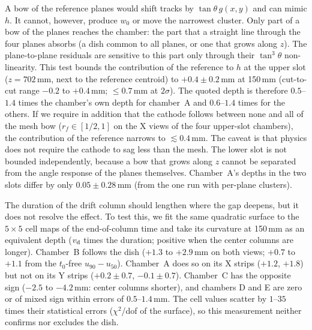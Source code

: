 A bow of the reference planes would shift tracks by $\tan\theta\, g(x,y)$ and can mimic $h$. It cannot, however,
produce $w_0$ or move the narrowest cluster. Only part of a bow of the planes reaches the chamber: the part that a
straight line through the four planes absorbs (a dish common to all planes, or one that grows along $z$). The
plane-to-plane residuals are sensitive to this part only through their $\tan^3\theta$ non-linearity. This test bounds
the contribution of the reference to $h$ at the upper slot ($z=702$\,mm, next to the reference centroid) to
$+0.4\pm0.2$\,mm at 150\,mm (cut-to-cut range $-0.2$ to $+0.4$\,mm; $\le0.7$\,mm at $2\sigma$). The quoted depth is
therefore $0.5$--$1.4$ times the chamber's own depth for chamber~A and $0.6$--$1.4$ times for the others. If we
require in addition that the cathode follows between none and all of the mesh bow ($r_f\in[1/2,1]$ on the X views of
the four upper-slot chambers), the contribution of the reference narrows to $\lesssim0.4$\,mm. The caveat is that
physics does not require the cathode to sag less than the mesh. The lower slot is not bounded independently, because
a bow that grows along $z$ cannot be separated from the angle response of the planes themselves. Chamber~A's depths in
the two slots differ by only $0.05\pm0.28$\,mm (from the one run with per-plane clusters).

The duration of the drift column should lengthen where the gap deepens, but it does not resolve the effect. To test
this, we fit the same quadratic surface to the $5\times5$ cell maps of the end-of-column time and take its curvature
at 150\,mm as an equivalent depth ($v_\mathrm{d}$ times the duration; positive when the center columns are longer). Chamber~B
follows the dish ($+1.3$ to $+2.9$\,mm on both views; $+0.7$ to $+1.1$ from the $t_0$-free $u_{90}-u_{50}$). Chamber~A
does so on its X strips ($+1.2$, $+1.8$) but not on its Y strips ($+0.2\pm0.7$, $-0.1\pm0.7$). Chamber~C has the
opposite sign ($-2.5$ to $-4.2$\,mm: center columns shorter), and chambers D and E are zero or of mixed sign within
errors of $0.5$--$1.4$\,mm. The cell values scatter by $1$--$35$ times their statistical errors ($\chi^2$/dof of the
surface), so this measurement neither confirms nor excludes the dish.

